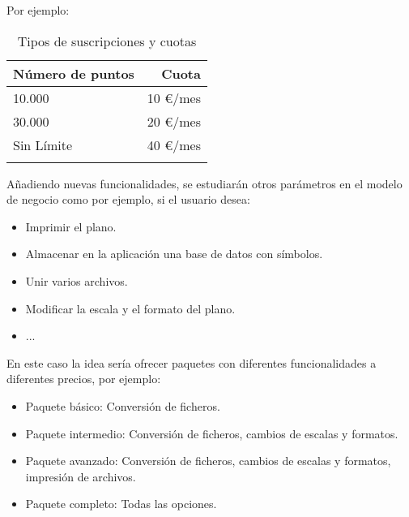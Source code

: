 Por ejemplo:
\begin{longtable}[]{@{}lr@{}}
\toprule
\begin{minipage}[b]{0.3\columnwidth}\raggedright\strut
\textbf{Número de puntos}\strut
\end{minipage} & \begin{minipage}[b]{0.18\columnwidth}\raggedright\strut
\textbf{Cuota}\strut
\end{minipage}\tabularnewline
\midrule
\endhead
\begin{minipage}[t]{0.3\columnwidth}\raggedright\strut
10.000 \strut
\end{minipage} & \begin{minipage}[t]{0.18\columnwidth}\raggedright\strut
10 \euro{}/mes \strut
\end{minipage}\tabularnewline
\begin{minipage}[t]{0.3\columnwidth}\raggedright\strut
30.000 \strut
\end{minipage} & \begin{minipage}[t]{0.18\columnwidth}\raggedright\strut
20 \euro{}/mes \strut
\end{minipage}\tabularnewline
\begin{minipage}[t]{0.3\columnwidth}\raggedright\strut
Sin Límite \strut
\end{minipage} & \begin{minipage}[t]{0.18\columnwidth}\raggedright\strut
40 \euro{}/mes \strut
\end{minipage}\tabularnewline
\bottomrule
\caption{Tipos de suscripciones y cuotas}
\end{longtable}

Añadiendo nuevas funcionalidades, se estudiarán otros parámetros en el modelo de negocio como por ejemplo, si el usuario desea:
\begin{itemize}
\item Imprimir el plano.
\item Almacenar en la aplicación una base de datos con símbolos.
\item Unir varios archivos.
\item Modificar la escala y el formato del plano.
\item ...
\end{itemize}

En este caso la idea sería ofrecer paquetes con diferentes funcionalidades a diferentes precios, por ejemplo:

\begin{itemize}
\item Paquete básico: Conversión de ficheros.
\item Paquete intermedio: Conversión de ficheros, cambios de escalas y formatos.
\item Paquete avanzado: Conversión de ficheros, cambios de escalas y formatos, impresión de archivos.
\item Paquete completo: Todas las opciones.
\end{itemize}

